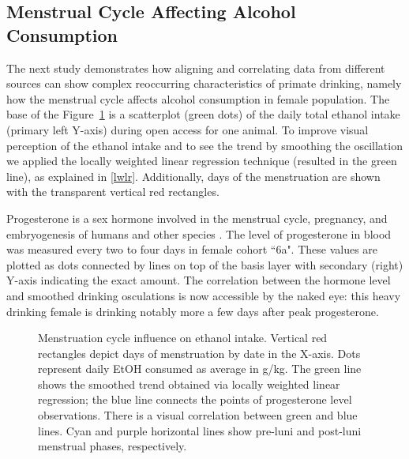 	
	\subsection{Menstrual Cycle Affecting Alcohol Consumption \label{section:mense}}
	The next study demonstrates how aligning and correlating data from different sources can show complex reoccurring characteristics of primate drinking, namely how the menstrual cycle affects alcohol consumption in female population. The base of the Figure~\ref{fig:mense} is a scatterplot (green dots) of the daily total ethanol intake (primary left Y-axis) during open access for one animal. To improve visual perception of the ethanol intake and to see the trend by smoothing the oscillation we applied the locally weighted linear regression technique (resulted in the green line), as explained in \cref{lwlr}. Additionally, days of the menstruation are shown with the transparent vertical red rectangles.
	
	Progesterone is a sex hormone involved in the menstrual cycle, pregnancy, and embryogenesis of humans and other species . The level of progesterone in blood was measured every two to four days in female cohort ``6a". These values are plotted as dots connected by lines on top of the basis layer with secondary (right) Y-axis indicating the exact amount. The correlation between the hormone level and smoothed drinking osculations is now accessible by the naked eye: this heavy drinking female is drinking notably more a few days after peak progesterone.   
	
	\begin{figure}[ht]
		\caption{Menstruation cycle influence on ethanol intake. Vertical red rectangles depict days of  menstruation by date in the X-axis. Dots represent daily EtOH consumed as average in g/kg. The green line shows the smoothed trend obtained via locally weighted linear regression; the blue line connects the points of progesterone level observations. There is a visual correlation between green and blue lines. Cyan and purple horizontal lines show pre-luni and post-luni menstrual phases, respectively.}
		\label{fig:mense}
	\end{figure}
	
